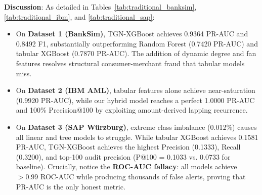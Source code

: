 \begin{table}[t]
\centering
\caption{Comparison of Performance Metrics with Traditional Machine Learning Models on Dataset 3 (SAP W\"urzburg).}
\label{tab:traditional_sap}
\end{table}

\textbf{Discussion}:
As detailed in Tables~\ref{tab:traditional_banksim}, \ref{tab:traditional_ibm}, and \ref{tab:traditional_sap}:
\begin{itemize}
    \item On \textbf{Dataset 1 (BankSim)}, TGN-XGBoost achieves 0.9364 PR-AUC and 0.8492 F1, substantially outperforming Random Forest (0.7420 PR-AUC) and tabular XGBoost (0.7870 PR-AUC). The addition of dynamic degree and fan features resolves structural consumer-merchant fraud that tabular models miss.
    \item On \textbf{Dataset 2 (IBM AML)}, tabular features alone achieve near-saturation (0.9920 PR-AUC), while our hybrid model reaches a perfect 1.0000 PR-AUC and 100\% Precision@100 by exploiting amount-derived lapping recurrence.
    \item On \textbf{Dataset 3 (SAP W\"urzburg)}, extreme class imbalance (0.012\%) causes all linear and tree models to struggle. While tabular XGBoost achieves 0.1581 PR-AUC, TGN-XGBoost achieves the highest Precision (0.1333), Recall (0.3200), and top-100 audit precision (P@100 = 0.1033 vs. 0.0733 for baseline). Crucially, notice the \textbf{ROC-AUC fallacy}: all models achieve $>0.99$ ROC-AUC while producing thousands of false alerts, proving that PR-AUC is the only honest metric.
\end{itemize}

